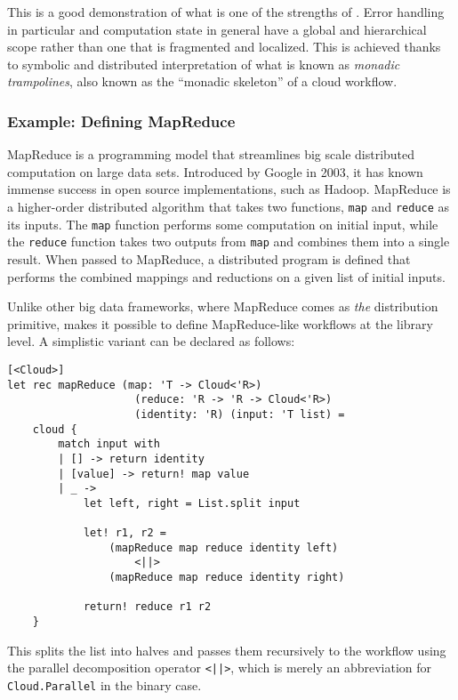 This is a good demonstration of what is one of the strengths of \mbrace.
Error handling in particular and computation state in general have a global and hierarchical
scope rather than one that is fragmented and localized.
This is achieved thanks to symbolic and distributed interpretation of what is known as
\emph{monadic trampolines}\cite{data-types-ala-carte, scala-trampolines}, 
also known as the ``monadic skeleton'' of a cloud workflow.


\subsubsection*{Example: Defining MapReduce}

MapReduce is a programming model that streamlines big scale distributed computation
on large data sets. Introduced by Google in 2003, it has known immense success in open
source implementations, such as Hadoop. MapReduce is a higher-order distributed algorithm
that takes two functions, \texttt{map} and \texttt{reduce} as its inputs. The \texttt{map}
function performs some computation on initial input, while the \texttt{reduce} function
takes two outputs from \texttt{map} and combines them into a single result. 
When passed to MapReduce, a distributed program is defined that performs the combined 
mappings and reductions on a given list of initial inputs.

Unlike other big data frameworks, where MapReduce comes as \emph{the} distribution primitive,
\mbrace{} makes it possible to define MapReduce-like workflows at the library level. 
A simplistic variant can be declared as follows:
\begin{lstlisting}
[<Cloud>]
let rec mapReduce (map: 'T -> Cloud<'R>) 
				    (reduce: 'R -> 'R -> Cloud<'R>) 
                    (identity: 'R) (input: 'T list) =
    cloud {
        match input with
        | [] -> return identity
        | [value] -> return! map value
        | _ ->
            let left, right = List.split input
 
            let! r1, r2 =
            	(mapReduce map reduce identity left)
            		<||>
	            (mapReduce map reduce identity right)
 
            return! reduce r1 r2
    }
\end{lstlisting}
This splits the list into halves and passes them 
recursively to the workflow using the parallel decomposition operator \texttt{<||>},
which is merely an abbreviation for \texttt{Cloud.Parallel} in the binary case.

